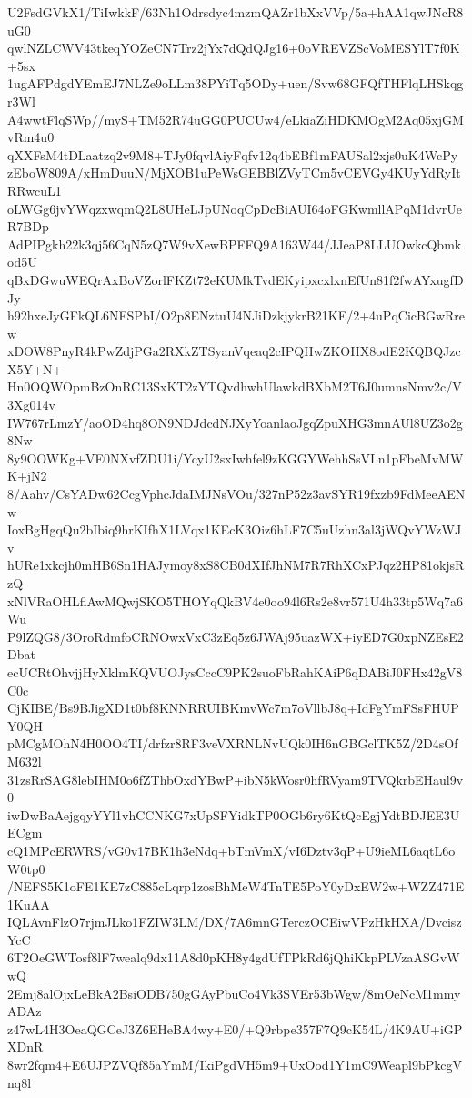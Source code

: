 U2FsdGVkX1/TiIwkkF/63Nh1Odrsdyc4mzmQAZr1bXxVVp/5a+hAA1qwJNcR8uG0
qwlNZLCWV43tkeqYOZeCN7Trz2jYx7dQdQJg16+0oVREVZScVoMESYlT7f0K+5sx
1ugAFPdgdYEmEJ7NLZe9oLLm38PYiTq5ODy+uen/Svw68GFQfTHFlqLHSkqgr3Wl
A4wwtFlqSWp//myS+TM52R74uGG0PUCUw4/eLkiaZiHDKMOgM2Aq05xjGMvRm4u0
qXXFsM4tDLaatzq2v9M8+TJy0fqvlAiyFqfv12q4bEBf1mFAUSal2xjs0uK4WcPy
zEboW809A/xHmDuuN/MjXOB1uPeWsGEBBlZVyTCm5vCEVGy4KUyYdRyItRRwcuL1
oLWGg6jvYWqzxwqmQ2L8UHeLJpUNoqCpDcBiAUI64oFGKwmllAPqM1dvrUeR7BDp
AdPIPgkh22k3qj56CqN5zQ7W9vXewBPFFQ9A163W44/JJeaP8LLUOwkcQbmkod5U
qBxDGwuWEQrAxBoVZorlFKZt72eKUMkTvdEKyipxcxlxnEfUn81f2fwAYxugfDJy
h92hxeJyGFkQL6NFSPbI/O2p8ENztuU4NJiDzkjykrB21KE/2+4uPqCicBGwRrew
xDOW8PnyR4kPwZdjPGa2RXkZTSyanVqeaq2cIPQHwZKOHX8odE2KQBQJzcX5Y+N+
Hn0OQWOpmBzOnRC13SxKT2zYTQvdhwhUlawkdBXbM2T6J0umnsNmv2c/V3Xg014v
IW767rLmzY/aoOD4hq8ON9NDJdcdNJXyYoanlaoJgqZpuXHG3mnAUl8UZ3o2g8Nw
8y9OOWKg+VE0NXvfZDU1i/YcyU2sxIwhfel9zKGGYWehhSsVLn1pFbeMvMWK+jN2
8/Aahv/CsYADw62CcgVphcJdaIMJNsVOu/327nP52z3avSYR19fxzb9FdMeeAENw
IoxBgHgqQu2bIbiq9hrKIfhX1LVqx1KEcK3Oiz6hLF7C5uUzhn3al3jWQvYWzWJv
hURe1xkcjh0mHB6Sn1HAJymoy8xS8CB0dXIfJhNM7R7RhXCxPJqz2HP81okjsRzQ
xNlVRaOHLflAwMQwjSKO5THOYqQkBV4e0oo94l6Rs2e8vr571U4h33tp5Wq7a6Wu
P9lZQG8/3OroRdmfoCRNOwxVxC3zEq5z6JWAj95uazWX+iyED7G0xpNZEsE2Dbat
ecUCRtOhvjjHyXklmKQVUOJysCccC9PK2suoFbRahKAiP6qDABiJ0FHx42gV8C0c
CjKIBE/Bs9BJigXD1t0bf8KNNRRUIBKmvWc7m7oVllbJ8q+IdFgYmFSsFHUPY0QH
pMCgMOhN4H0OO4TI/drfzr8RF3veVXRNLNvUQk0IH6nGBGclTK5Z/2D4sOfM632l
31zsRrSAG8lebIHM0o6fZThbOxdYBwP+ibN5kWosr0hfRVyam9TVQkrbEHaul9v0
iwDwBaAejgqyYYl1vhCCNKG7xUpSFYidkTP0OGb6ry6KtQcEgjYdtBDJEE3UECgm
cQ1MPcERWRS/vG0v17BK1h3eNdq+bTmVmX/vI6Dztv3qP+U9ieML6aqtL6oW0tp0
/NEFS5K1oFE1KE7zC885cLqrp1zosBhMeW4TnTE5PoY0yDxEW2w+WZZ471E1KuAA
IQLAvnFlzO7rjmJLko1FZIW3LM/DX/7A6mnGTerczOCEiwVPzHkHXA/DvciszYcC
6T2OeGWTosf8lF7wealq9dx11A8d0pKH8y4gdUfTPkRd6jQhiKkpPLVzaASGvWwQ
2Emj8alOjxLeBkA2BsiODB750gGAyPbuCo4Vk3SVEr53bWgw/8mOeNcM1mmyADAz
z47wL4H3OeaQGCeJ3Z6EHeBA4wy+E0/+Q9rbpe357F7Q9cK54L/4K9AU+iGPXDnR
8wr2fqm4+E6UJPZVQf85aYmM/IkiPgdVH5m9+UxOod1Y1mC9Weapl9bPkcgVnq8l
